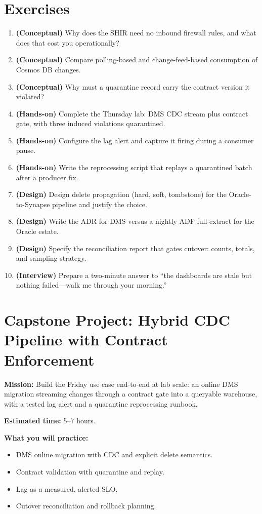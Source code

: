 \section{Exercises}
\begin{enumerate}
    \item \textbf{(Conceptual)} Why does the SHIR need no inbound firewall rules, and what does that cost you operationally?
    \item \textbf{(Conceptual)} Compare polling-based and change-feed-based consumption of Cosmos DB changes.
    \item \textbf{(Conceptual)} Why must a quarantine record carry the contract version it violated?
    \item \textbf{(Hands-on)} Complete the Thursday lab: DMS CDC stream plus contract gate, with three induced violations quarantined.
    \item \textbf{(Hands-on)} Configure the lag alert and capture it firing during a consumer pause.
    \item \textbf{(Hands-on)} Write the reprocessing script that replays a quarantined batch after a producer fix.
    \item \textbf{(Design)} Design delete propagation (hard, soft, tombstone) for the Oracle-to-Synapse pipeline and justify the choice.
    \item \textbf{(Design)} Write the ADR for DMS versus a nightly ADF full-extract for the Oracle estate.
    \item \textbf{(Design)} Specify the reconciliation report that gates cutover: counts, totals, and sampling strategy.
    \item \textbf{(Interview)} Prepare a two-minute answer to ``the dashboards are stale but nothing failed---walk me through your morning.''
\end{enumerate}

\section{Capstone Project: Hybrid CDC Pipeline with Contract Enforcement}\label{sec:ch11-capstone}

\begin{capstonebox}
\textbf{Mission:} Build the Friday use case end-to-end at lab scale: an online DMS migration streaming changes through a contract gate into a queryable warehouse, with a tested lag alert and a quarantine reprocessing runbook.

\textbf{Estimated time:} 5--7 hours.

\textbf{What you will practice:}
\begin{itemize}
    \item DMS online migration with CDC and explicit delete semantics.
    \item Contract validation with quarantine and replay.
    \item Lag as a measured, alerted SLO.
    \item Cutover reconciliation and rollback planning.
\end{itemize}
\end{capstonebox}

